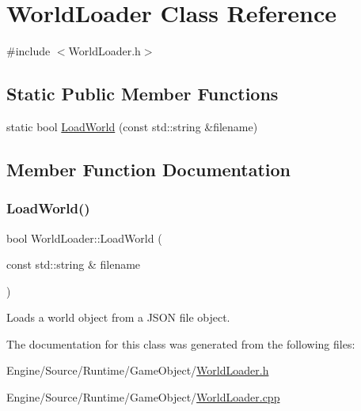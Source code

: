 \hypertarget{class_world_loader}{}\section{World\+Loader Class Reference}
\label{class_world_loader}


{\ttfamily \#include $<$World\+Loader.\+h$>$}

\subsection*{Static Public Member Functions}
\begin{DoxyCompactItemize}
\item 
static bool \mbox{\hyperlink{class_world_loader_a1e5dea70d3a7d5d75d352a5041c3f86a}{Load\+World}} (const std\+::string \&filename)
\end{DoxyCompactItemize}


\subsection{Member Function Documentation}
\mbox{\label{class_world_loader_a1e5dea70d3a7d5d75d352a5041c3f86a}} 
\subsubsection{\texorpdfstring{Load\+World()}{LoadWorld()}}
{\footnotesize\ttfamily bool World\+Loader\+::\+Load\+World (\begin{DoxyParamCaption}\item[{const std\+::string \&}]{filename }\end{DoxyParamCaption})\hspace{0.3cm}{\ttfamily [static]}}

Loads a world object from a J\+S\+ON file object. 

The documentation for this class was generated from the following files\+:\begin{DoxyCompactItemize}
\item 
Engine/\+Source/\+Runtime/\+Game\+Object/\mbox{\hyperlink{_world_loader_8h}{World\+Loader.\+h}}\item 
Engine/\+Source/\+Runtime/\+Game\+Object/\mbox{\hyperlink{_world_loader_8cpp}{World\+Loader.\+cpp}}\end{DoxyCompactItemize}
